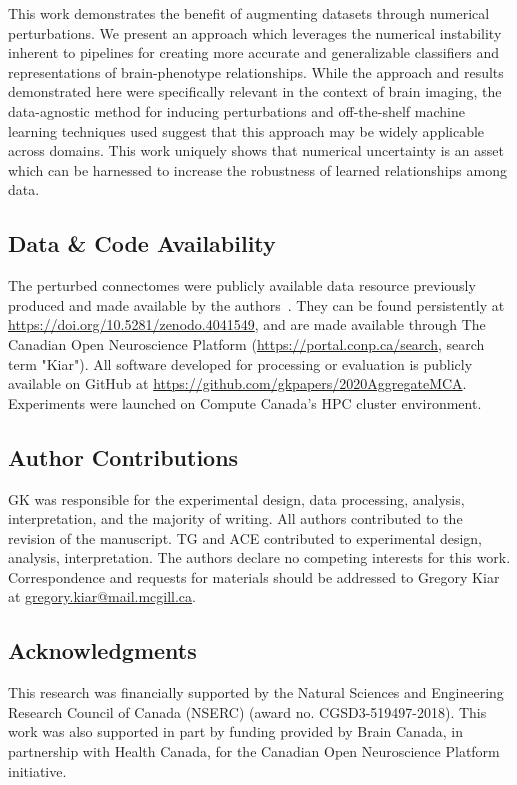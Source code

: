 \documentclass[10pt]{SelfArx} %
\begin{document}
This work demonstrates the benefit of augmenting datasets through numerical perturbations. We present an approach which
leverages the numerical instability inherent to pipelines for creating more accurate and generalizable classifiers and
representations of brain-phenotype relationships. While the approach and results demonstrated here were specifically
relevant in the context of brain imaging, the data-agnostic method for inducing perturbations and off-the-shelf machine
learning techniques used suggest that this approach may be widely applicable across domains. This work uniquely shows
that numerical uncertainty is an asset which can be harnessed to increase the robustness of learned relationships among
data.


\subsection*{Data \& Code Availability}
The perturbed connectomes were publicly available data resource previously produced and made available by the
authors~\cite{Kiar2020-yz}. They can be found persistently at \url{https://doi.org/10.5281/zenodo.4041549}, and are
made available through The Canadian Open Neuroscience Platform (\url{https://portal.conp.ca/search}, search term
"Kiar"). All software developed for processing or evaluation is publicly available on GitHub at
\url{https://github.com/gkpapers/2020AggregateMCA}. Experiments were launched on Compute Canada's HPC cluster
environment. 

\subsection*{Author Contributions}
GK was responsible for the experimental design, data processing, analysis, interpretation, and the majority of writing.
All authors contributed to the revision of the manuscript. TG and ACE contributed to experimental design, analysis,
interpretation. The authors declare no competing interests for this work. Correspondence and requests for materials
should be addressed to Gregory Kiar at \url{gregory.kiar@mail.mcgill.ca}.

\subsection*{Acknowledgments} 
This research was financially supported by the Natural Sciences and Engineering Research Council of Canada (NSERC)
(award no. CGSD3-519497-2018). This work was also supported in part by funding provided by Brain Canada, in partnership
with Health Canada, for the Canadian Open Neuroscience Platform initiative.



\end{document}
